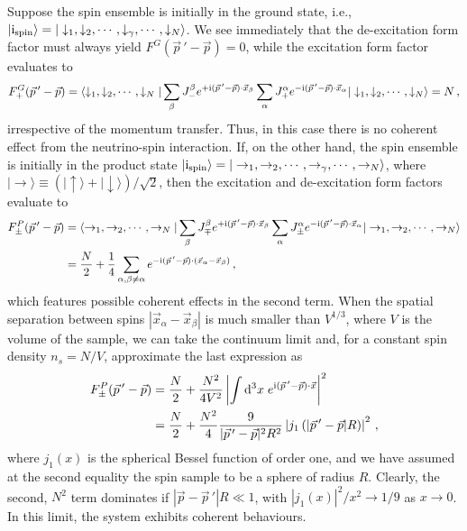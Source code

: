 \documentclass[aps,prd,10pt,twocolumn,superscriptaddress,floatfix,nofootinbib,amsmath,amssymb,altaffilletter,preprintnumbers]{revtex4-1}
\begin{document}
Suppose the spin ensemble is initially in the ground state, i.e., $|{\rm i}_{\rm spin} \rangle = |\downarrow_1,\downarrow_2,\cdots,\downarrow_\gamma, \cdots, \downarrow_N \rangle$.   We see immediately that the de-excitation form factor must always yield $F^G (\vec{p}\,'-\vec{p})=0$, while the excitation form factor evaluates to
\begin{equation}
 F^G_+(\vec{p}\,'-\vec{p}) = \langle\downarrow_1,\downarrow_2, \cdots, \downarrow_N | \sum_\beta  J_-^\beta e^{+{\rm i} (\vec{p}\,' - \vec{p})\cdot \vec{x}_\beta} \sum_\alpha  J_+^\alpha e^{-{\rm i} (\vec{p}\,' - \vec{p})\cdot \vec{x}_\alpha}|\downarrow_1,\downarrow_2, \cdots, \downarrow_N \rangle=N\, ,
\end{equation}
irrespective of the momentum transfer. Thus, in this case there is no coherent effect from the neutrino-spin interaction.  If, on the other hand, the spin ensemble is initially in the product state $|{\rm i}_{\rm spin} \rangle = |\rightarrow_1, \rightarrow_2, \cdots, \rightarrow_\gamma, \cdots, \rightarrow_N \rangle$, where $|\rightarrow \rangle \equiv (|\uparrow \rangle + |\downarrow \rangle)/\sqrt{2}$, then the excitation and de-excitation form factors evaluate to
\begin{equation}
\begin{aligned}
 F^P_\pm(\vec{p}\,'-\vec{p}) & = \langle \rightarrow_1,\rightarrow_2, \cdots, \rightarrow_N | \sum_\beta  J_\mp^\beta e^{+{\rm i} (\vec{p}\,' - \vec{p})\cdot \vec{x}_\beta} \sum_\alpha  J_\pm^\alpha e^{-{\rm i} (\vec{p}\,' - \vec{p})\cdot \vec{x}_\alpha} |\rightarrow_1,\rightarrow_2, \cdots, \rightarrow_N \rangle\\
 & =\frac{N}{2}+\frac{1}{4}\sum_{\alpha, \beta \neq \alpha} e^{-{\rm i} (\vec{p}\,' - \vec{p})\cdot (\vec{x}_{\alpha}-\vec{x}_\beta)}\, ,
\end{aligned}
\end{equation}
which features possible coherent effects in the second term.  When the spatial separation between spins $|\vec{x}_{\alpha}-\vec{x}_\beta|$ is much smaller than $V^{1/3}$, where $V$ is the volume of the sample, we can take the continuum limit and, for a constant spin density $n_s=N/V$, approximate the last expression as
\begin{equation}
\begin{aligned}
F^P_\pm(\vec{p}\,'-\vec{p}) &= \frac{N}{2} +\frac{N^2}{4 V^2} \left| \int {\rm d}^3 x \; e^{{\rm i}(\vec{p}\,'-\vec{p})\cdot\vec{x}} \right|^2 \\
&= \frac{N}{2} + \frac{N^2}{4} \frac{9}{|\vec{p}\,'-\vec{p}|^2 R^2} \left|j_1\left(|\vec{p}\,'-\vec{p}| R\right) \right|^2\, ,
\label{eq:formP}
\end{aligned}
\end{equation}
where $j_1(x)$ is the spherical Bessel function of order one, and we have assumed at the second equality the spin sample to be a sphere of radius $R$.  Clearly, the second, $N^2$ term dominates if $|\vec{p}-\vec{p}\,'|R\ll1$,  with $|j_1(x)|^2/x^2 \to 1/9$ as $x \to 0$.
In this limit, the system exhibits coherent behaviours. 
\end{document}
